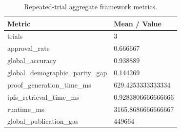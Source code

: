 \begin{table}[t]
\centering
\caption{Repeated-trial aggregate framework metrics.}
\small
\begin{tabular}{ll}
\hline
Metric & Mean / Value \\
\hline
trials & 3 \\
approval\_rate & 0.666667 \\
global\_accuracy & 0.938889 \\
global\_demographic\_parity\_gap & 0.144269 \\
proof\_generation\_time\_ms & 629.4253333333334 \\
ipfs\_retrieval\_time\_ms & 0.9283806666666666 \\
runtime\_ms & 3165.8686666666667 \\
global\_publication\_gas & 449664 \\
\hline
\end{tabular}
\end{table}
